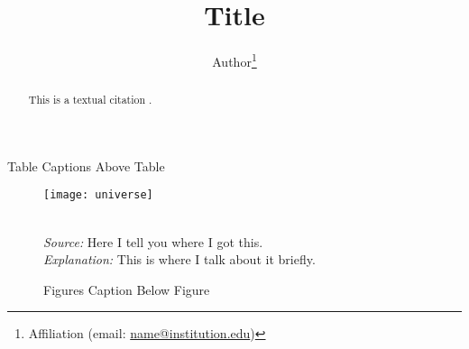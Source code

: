 \documentclass{cgu}
\title{Title}
\author{Author\thanks{Affiliation (email: \href{mailto:name@institution.edu}{name@institution.edu})}}
\begin{document}
\maketitle

\begin{abstract}
This is a textual citation \citet{Einstein1905}.
\end{abstract}

\onehalfspacing

\begin{table}[!hbpt]
    \caption{Table Captions Above Table}
    
    \label{tab:Table1}
\end{table}

\begin{figure}[!hbpt]
    {\centering
    \texttt{[image: universe]}
    }\\
    \raggedright
    \footnotesize
    \emph{\\Source:} Here I tell you where I got this.\\
    \emph{Explanation:} This is where I talk about it briefly.
    \caption{Figures Caption Below Figure}
    \label{fig:Figure1}
\end{figure}

\singlespacing
\printbibliography
\end{document}
